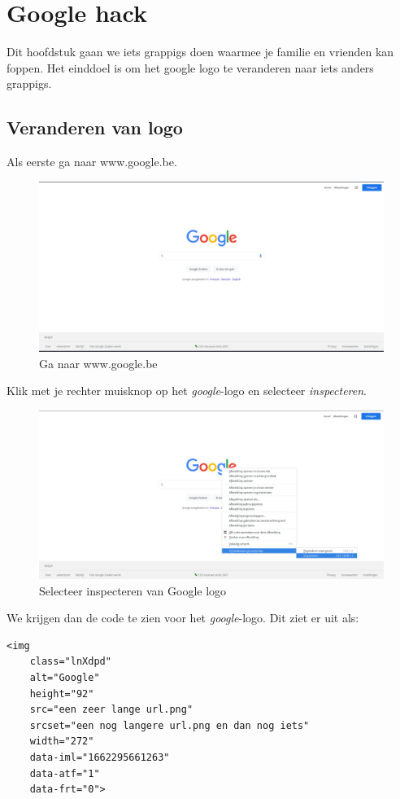 \chapter{Google hack}

Dit hoofdstuk gaan we iets grappigs doen waarmee je familie en vrienden kan
foppen. Het einddoel is om het google logo te veranderen naar iets anders
grappigs.

\section{Veranderen van logo}

Als eerste ga naar www.google.be.

\begin{figure}[htpb]
    \centering
    \includegraphics[width=0.6\linewidth]{figures/ga_naar_www_google_be.png}
    \caption{Ga naar www.google.be}
    \label{fig:ga_naar_www_google_be}
\end{figure}

Klik met je rechter muisknop op het \emph{google}-logo en selecteer \emph{inspecteren}.

\begin{figure}[htpb]
    \centering
    \includegraphics[width=0.6\linewidth]{figures/selecteer_inspecteren_van_google_logo.png}
    \caption{Selecteer inspecteren van Google logo}
    \label{fig:selecteer_inspecteren_van_google_logo}
\end{figure}

We krijgen dan de code te zien voor het \emph{google}-logo. Dit ziet er uit als:
\begin{verbatim}
<img 
    class="lnXdpd"
    alt="Google"
    height="92"
    src="een zeer lange url.png"
    srcset="een nog langere url.png en dan nog iets"
    width="272"
    data-iml="1662295661263"
    data-atf="1"
    data-frt="0"> 
\end{verbatim}

